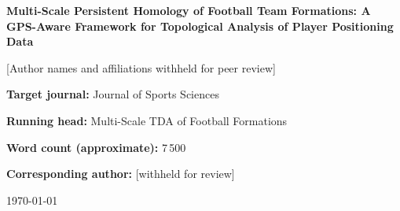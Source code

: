 \documentclass[11pt,a4paper]{article}
\begin{document}
\begin{titlepage}
\centering
\vspace*{2cm}

{\LARGE\bfseries Multi-Scale Persistent Homology of Football
Team Formations: A GPS-Aware Framework for Topological
Analysis of Player Positioning Data\par}

\vspace{1.5cm}

{\large
[Author names and affiliations withheld for peer review]
\par}

\vspace{1cm}

\textbf{Target journal:} Journal of Sports Sciences

\vspace{1cm}

\textbf{Running head:} Multi-Scale TDA of Football Formations

\vspace{1cm}

\textbf{Word count (approximate):} 7\,500

\vspace{1cm}

\textbf{Corresponding author:} [withheld for review]

\vfill
\today
\end{titlepage}
\end{document}
